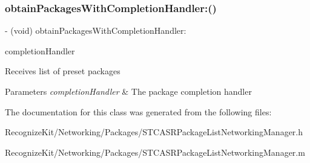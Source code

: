 \subsubsection{\texorpdfstring{obtain\+Packages\+With\+Completion\+Handler\+:()}{obtainPackagesWithCompletionHandler:()}}
{\footnotesize\ttfamily -\/ (void) obtain\+Packages\+With\+Completion\+Handler\+: \begin{DoxyParamCaption}\item[{(Completion\+Handler)}]{completion\+Handler }\end{DoxyParamCaption}}

Receives list of preset packages 
\begin{DoxyParams}{Parameters}
{\em completion\+Handler} & The package completion handler \\
\hline
\end{DoxyParams}


The documentation for this class was generated from the following files\+:\begin{DoxyCompactItemize}
\item 
Recognize\+Kit/\+Networking/\+Packages/S\+T\+C\+A\+S\+R\+Package\+List\+Networking\+Manager.\+h\item 
Recognize\+Kit/\+Networking/\+Packages/S\+T\+C\+A\+S\+R\+Package\+List\+Networking\+Manager.\+m\end{DoxyCompactItemize}
